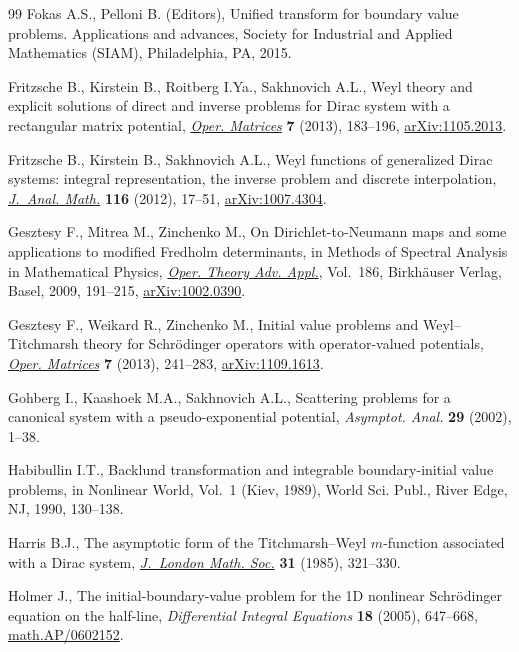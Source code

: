 \documentclass[pdftex]{sigma}
\numberwithin{equation}{section}
\begin{document}
\begin{thebibliography}{99}
Fokas A.S., Pelloni B. (Editors), Unif\/ied transform for boundary value
 problems. Applications and advances, Society for Industrial and Applied
 Mathematics (SIAM), Philadelphia, PA, 2015.

Fritzsche B., Kirstein B., Roitberg I.Ya., Sakhnovich A.L., Weyl theory and
 explicit solutions of direct and inverse problems for {D}irac system with a
 rectangular matrix potential, \href{http://dx.doi.org/10.7153/oam-07-10}{\textit{Oper. Matrices}} \textbf{7} (2013),
 183--196, \href{http://arxiv.org/abs/1105.2013}{arXiv:1105.2013}.

Fritzsche B., Kirstein B., Sakhnovich A.L., Weyl functions of generalized
 {D}irac systems: integral representation, the inverse problem and discrete
 interpolation, \href{http://dx.doi.org/10.1007/s11854-012-0002-x}{\textit{J.~Anal. Math.}} \textbf{116} (2012), 17--51,
 \href{http://arxiv.org/abs/1007.4304}{arXiv:1007.4304}.

Gesztesy F., Mitrea M., Zinchenko M., On {D}irichlet-to-{N}eumann maps and some
 applications to modif\/ied {F}redholm determinants, in Methods of Spectral
 Analysis in Mathematical Physics, \href{http://dx.doi.org/10.1007/978-3-7643-8755-6_9}{\textit{Oper. Theory Adv. Appl.}}, Vol.~186,
 Birkh\"auser Verlag, Basel, 2009, 191--215, \href{http://arxiv.org/abs/1002.0390}{arXiv:1002.0390}.

Gesztesy F., Weikard R., Zinchenko M., Initial value problems and
 {W}eyl--{T}itchmarsh theory for {S}chr\"odinger operators with
 operator-valued potentials, \href{http://dx.doi.org/10.7153/oam-07-15}{\textit{Oper. Matrices}} \textbf{7} (2013),
 241--283, \href{http://arxiv.org/abs/1109.1613}{arXiv:1109.1613}.

Gohberg I., Kaashoek M.A., Sakhnovich A.L., Scattering problems for a canonical
 system with a pseudo-exponential potential, \textit{Asymptot. Anal.}
 \textbf{29} (2002), 1--38.

Habibullin I.T., Backlund transformation and integrable boundary-initial value
 problems, in Nonlinear World, {V}ol.~1 ({K}iev, 1989), World Sci. Publ.,
 River Edge, NJ, 1990, 130--138.

Harris B.J., The asymptotic form of the {T}itchmarsh--{W}eyl {$m$}-function
 associated with a {D}irac system, \href{http://dx.doi.org/10.1112/jlms/s2-31.2.321}{\textit{J.~London Math. Soc.}} \textbf{31}
 (1985), 321--330.

Holmer J., The initial-boundary-value problem for the 1{D} nonlinear
 {S}chr\"odinger equation on the half-line, \textit{Differential Integral
 Equations} \textbf{18} (2005), 647--668, \href{http://arxiv.org/abs/math.AP/0602152}{math.AP/0602152}.


\end{thebibliography}
\end{document}
